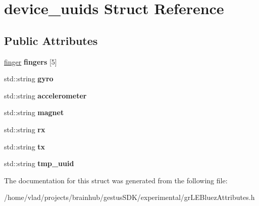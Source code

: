 \hypertarget{structdevice__uuids}{}\section{device\+\_\+uuids Struct Reference}
\label{structdevice__uuids}
\subsection*{Public Attributes}
\begin{DoxyCompactItemize}
\item 
\mbox{\label{structdevice__uuids_a97d5ed5abadd8a616af4ff63ca04abb7}} 
\mbox{\hyperlink{structfinger}{finger}} {\bfseries fingers} \mbox{[}5\mbox{]}
\item 
\mbox{\label{structdevice__uuids_ac693aab2b40e74989e0263611d3aeaa6}} 
std\+::string {\bfseries gyro}
\item 
\mbox{\label{structdevice__uuids_a64e32986e00d0e2e17b0a7c483fd4ab4}} 
std\+::string {\bfseries accelerometer}
\item 
\mbox{\label{structdevice__uuids_aa7c316bf72656b77ce08940bd163d863}} 
std\+::string {\bfseries magnet}
\item 
\mbox{\label{structdevice__uuids_ac2dad171c756ef00fbda3bb436046395}} 
std\+::string {\bfseries rx}
\item 
\mbox{\label{structdevice__uuids_a35e3ec1e919eee33abe7871287830637}} 
std\+::string {\bfseries tx}
\item 
\mbox{\label{structdevice__uuids_ab93540c7489b327f629a83b623b24988}} 
std\+::string {\bfseries tmp\+\_\+uuid}
\end{DoxyCompactItemize}


The documentation for this struct was generated from the following file\+:\begin{DoxyCompactItemize}
\item 
/home/vlad/projects/brainhub/gestus\+S\+D\+K/experimental/gr\+L\+E\+Bluez\+Attributes.\+h\end{DoxyCompactItemize}
